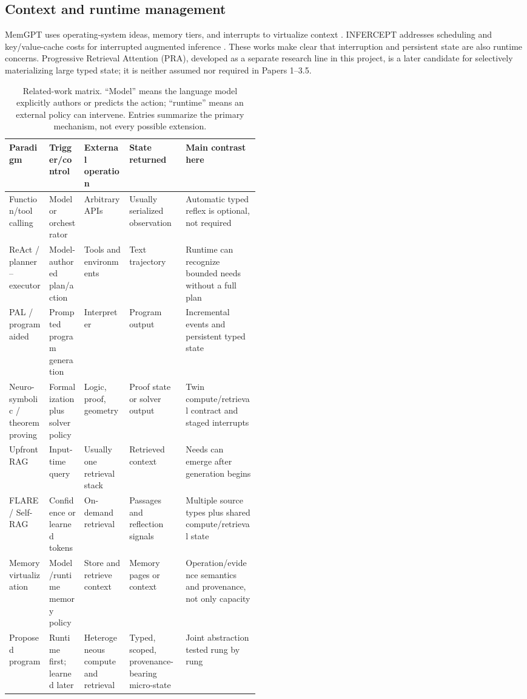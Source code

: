 \documentclass[11pt]{article}
\begin{document}
\subsection{Context and runtime management}

MemGPT uses operating-system ideas, memory tiers, and interrupts to virtualize
context \cite{memgpt}.  INFERCEPT addresses scheduling and key/value-cache costs
for interrupted augmented inference \cite{infercept}.  These works make clear
that interruption and persistent state are also runtime concerns.  Progressive
Retrieval Attention (PRA), developed as a separate research line in this
project, is a later candidate for selectively materializing large typed state;
it is neither assumed nor required in Papers 1--3.5.

\begin{table}[t]
\centering
\footnotesize
\setlength{\tabcolsep}{3pt}
\caption{Related-work matrix.  ``Model'' means the language model explicitly
authors or predicts the action; ``runtime'' means an external policy can
intervene.  Entries summarize the primary mechanism, not every possible
extension.}
\label{tab:related}
\begin{tabularx}{\linewidth}{@{}p{0.16\linewidth}p{0.14\linewidth}p{0.18\linewidth}YY@{}}
\toprule
Paradigm & Trigger/control & External operation & State returned & Main contrast here \\
\midrule
Function/tool calling & Model or orchestrator & Arbitrary APIs & Usually serialized observation & Automatic typed reflex is optional, not required \\
ReAct / planner--executor & Model-authored plan/action & Tools and environments & Text trajectory & Runtime can recognize bounded needs without a full plan \\
PAL / program aided & Prompted program generation & Interpreter & Program output & Incremental events and persistent typed state \\
Neuro-symbolic / theorem proving & Formalization plus solver policy & Logic, proof, geometry & Proof state or solver output & Twin compute/retrieval contract and staged interrupts \\
Upfront RAG & Input-time query & Usually one retrieval stack & Retrieved context & Needs can emerge after generation begins \\
FLARE / Self-RAG & Confidence or learned tokens & On-demand retrieval & Passages and reflection signals & Multiple source types plus shared compute/retrieval state \\
Memory virtualization & Model/runtime memory policy & Store and retrieve context & Memory pages or context & Operation/evidence semantics and provenance, not only capacity \\
Proposed program & Runtime first; learned later & Heterogeneous compute and retrieval & Typed, scoped, provenance-bearing micro-state & Joint abstraction tested rung by rung \\
\bottomrule
\end{tabularx}
\end{table}
\end{document}

